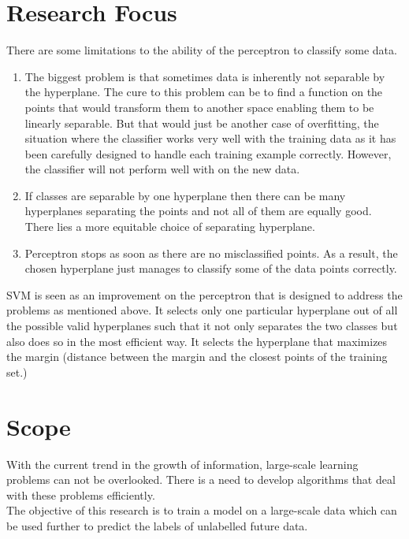 \documentclass{article}
\begin{document}
\section{Research Focus}
There are some limitations to the ability of the perceptron to classify some data.
\begin{enumerate}
    \item The biggest problem is that sometimes data is inherently not separable by the hyperplane. The cure to this problem can be to find a function on the points that would transform them to another space enabling them to be linearly separable. But that would just be another case of overfitting, the situation where the classifier works very well with the training data as it has been carefully designed to handle each training example correctly. However, the classifier will not perform well with on the new data.
\item If classes are separable by one hyperplane then there can be many hyperplanes separating the points and not all of them are equally good. There lies a more equitable choice of separating hyperplane.
\item Perceptron stops as soon as there are no misclassified points. As a result, the chosen hyperplane just manages to classify some of the data points correctly.
\end{enumerate}
SVM is seen as an improvement on the perceptron that is designed to address the problems as mentioned above. It selects only one particular hyperplane out of all the possible valid hyperplanes such that it not only separates the two classes but also does so in the most efficient way. It selects the hyperplane that maximizes the margin (distance between the margin and the closest points of the training set.)


\section{Scope}
With the current trend in the growth of information, large-scale learning problems can not be overlooked. There is a need to develop algorithms that deal with these problems efficiently.\\
The objective of this research is to train a model on a large-scale data which can be used further to predict the labels of unlabelled future data.



\nocite{winnow,wikiedits,carlson1999snow,menon2009large,book}


\end{document}
